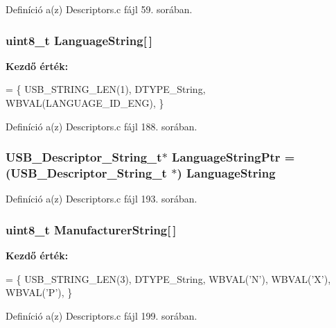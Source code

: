 Definíció a(z) Descriptors.\-c fájl 59. sorában.

\subsubsection[{Language\-String}]{\setlength{\rightskip}{0pt plus 5cm}uint8\-\_\-t Language\-String[$\,$]}\label{_descriptors_8c_a156d44ced236ce8b684a10b2ebb9cd70}
{\bfseries Kezdő érték\-:}
\begin{DoxyCode}
= \{
    USB\_STRING\_LEN(1),
    DTYPE\_String,
    WBVAL(LANGUAGE\_ID\_ENG),
\}
\end{DoxyCode}


Definíció a(z) Descriptors.\-c fájl 188. sorában.

\subsubsection[{Language\-String\-Ptr}]{\setlength{\rightskip}{0pt plus 5cm}U\-S\-B\-\_\-\-Descriptor\-\_\-\-String\-\_\-t$\ast$ Language\-String\-Ptr = (U\-S\-B\-\_\-\-Descriptor\-\_\-\-String\-\_\-t $\ast$) {\bf Language\-String}}\label{_descriptors_8c_a9f3f62928cb9d5d2ca9fbf5eede1cc52}


Definíció a(z) Descriptors.\-c fájl 193. sorában.

\subsubsection[{Manufacturer\-String}]{\setlength{\rightskip}{0pt plus 5cm}uint8\-\_\-t Manufacturer\-String[$\,$]}\label{_descriptors_8c_af43938f971837cb37b3191312503a7a3}
{\bfseries Kezdő érték\-:}
\begin{DoxyCode}
= \{
    USB\_STRING\_LEN(3),
    DTYPE\_String,
    WBVAL(\textcolor{charliteral}{'N'}),
    WBVAL(\textcolor{charliteral}{'X'}),
    WBVAL(\textcolor{charliteral}{'P'}),
\}
\end{DoxyCode}


Definíció a(z) Descriptors.\-c fájl 199. sorában.

